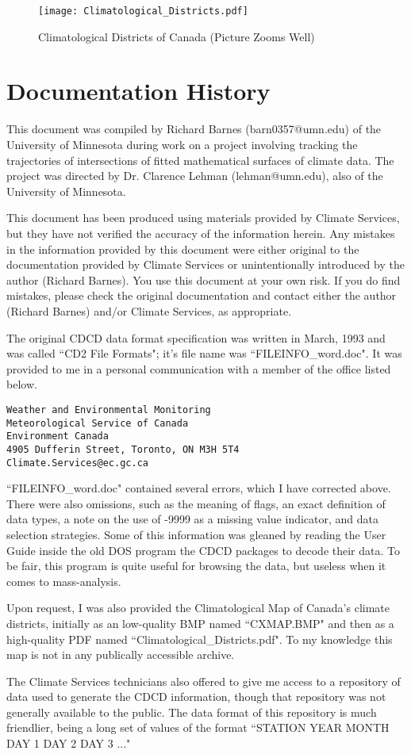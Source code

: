 \documentclass[12pt]{article}
\begin{document}
\begin{figure*}[h]
\centering
\texttt{[image: Climatological\_Districts.pdf]}
\caption{Climatological Districts of Canada (Picture Zooms Well)}
\end{figure*}

\section{Documentation History}
This document was compiled by Richard Barnes (barn0357@umn.edu) of the University of Minnesota during work on a project involving tracking the trajectories of intersections of fitted mathematical surfaces of climate data. The project was directed by Dr. Clarence Lehman (lehman@umn.edu), also of the University of Minnesota.

This document has been produced using materials provided by Climate Services, but they have not verified the accuracy of the information herein. Any mistakes in the information provided by this document were either original to the documentation provided by Climate Services or unintentionally introduced by the author (Richard Barnes). You use this document at your own risk. If you do find mistakes, please check the original documentation and contact either the author (Richard Barnes) and/or Climate Services, as appropriate.

The original CDCD data format specification was written in March, 1993 and was called ``CD2 File Formats"; it's file name was ``FILEINFO\_word.doc". It was provided to me in a personal communication with a member of the office listed below.

\begin{verbatim}
Weather and Environmental Monitoring 
Meteorological Service of Canada 
Environment Canada 
4905 Dufferin Street, Toronto, ON M3H 5T4 
Climate.Services@ec.gc.ca
\end{verbatim}

``FILEINFO\_word.doc" contained several errors, which I have corrected above. There were also omissions, such as the meaning of flags, an exact definition of data types, a note on the use of -9999 as a missing value indicator, and data selection strategies. Some of this information was gleaned by reading the User Guide inside the old DOS program the CDCD packages to decode their data. To be fair, this program is quite useful for browsing the data, but useless when it comes to mass-analysis.

Upon request, I was also provided the Climatological Map of Canada's climate districts, initially as an low-quality BMP named ``CXMAP.BMP" and then as a high-quality PDF named ``Climatological\_Districts.pdf". To my knowledge this map is not in any publically accessible archive.

The Climate Services technicians also offered to give me access to a repository of data used to generate the CDCD information, though that repository was not generally available to the public. The data format of this repository is much friendlier, being a long set of values of the format ``STATION YEAR MONTH DAY 1 DAY 2 DAY 3 ..."
\end{document}
